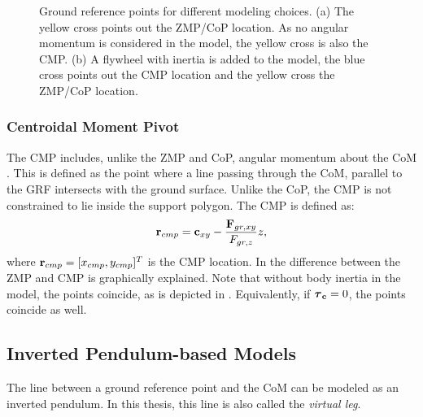 \begin{figure}
\begin{subfigure}{0.49\textwidth}
\caption{}
\label{fig:3dlipfootinertia}
\end{subfigure}
\caption{Ground reference points for different modeling choices. (a) The yellow cross points out the \ac{ZMP}/\ac{CoP} location. As no angular momentum is considered in the model,  the yellow cross is also the \ac{CMP}. (b) A flywheel with inertia is added to the model, the blue cross points out the \ac{CMP} location and the yellow cross the \ac{ZMP}/\ac{CoP} location.}
\label{fig:zmpvscmp}
\end{figure}

\subsubsection{Centroidal Moment Pivot} 
The \acf{CMP} includes, unlike the \ac{ZMP} and \ac{CoP}, angular momentum about the \ac{CoM}  \cite{popovic2005ground}. This is defined as the point where a line passing through the \ac{CoM}, parallel to the \ac{GRF} intersects with the ground surface. Unlike the \ac{CoP}, the \ac{CMP} is not constrained to lie inside the support polygon. The \ac{CMP} is defined as:
\begin{equation}
    \mathbf{r}_{cmp}=\mathbf{c}_{xy}-\frac{\mathbf{F}_{gr,xy}}{F_{gr,z}}z,
    \label{eq:cmp}
\end{equation}
where $\mathbf{r}_{cmp} =[x_{cmp}, y_{cmp}]^T$ is the \ac{CMP} location. In  the difference between the \ac{ZMP} and \ac{CMP} is graphically explained. Note that without body inertia in the model, the points coincide, as is depicted in . Equivalently, if $\boldsymbol{\tau}_{\mathbf{c}}=0$, the points coincide as well.

\subsection{Inverted Pendulum-based Models}
The line between a ground reference point and the \ac{CoM} can be modeled as an inverted pendulum. In this thesis, this line is also called the \textit{virtual leg}.

